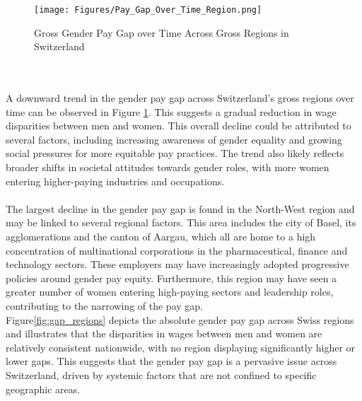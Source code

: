 \documentclass{article}
\begin{document}
\begin{figure}[t]
    \centering
    \texttt{[image: Figures/Pay\_Gap\_Over\_Time\_Region.png]}
    \caption{Gross Gender Pay Gap over Time Across Gross Regions in Switzerland}
    \label{fig:trend_regions}
\end{figure}
\\
\\
A downward trend in the gender pay gap across Switzerland's gross regions over time can be observed in Figure \ref{fig:trend_regions}. This suggests a gradual reduction in wage disparities between men and women. This overall decline could be attributed to several factors, including increasing awareness of gender equality and growing social pressures for more equitable pay practices. The trend also likely reflects broader shifts in societal attitudes towards gender roles, with more women entering higher-paying industries and occupations.\\
\\
The largest decline in the gender pay gap is found in the North-West region and may be linked to several regional factors. This area includes the city of Basel, its agglomerations and the canton of Aargau, which all are home to a high concentration of multinational corporations in the pharmaceutical, finance and technology sectors. These employers may have increasingly adopted progressive policies around gender pay equity. Furthermore, this region may have seen a greater number of women entering high-paying sectors and leadership roles, contributing to the narrowing of the pay gap.\\

Figure\ref{fig:gap_regions} depicts the absolute gender pay gap across Swiss regions and illustrates that the disparities in wages between men and women are relatively consistent nationwide, with no region displaying significantly higher or lower gaps. This suggests that the gender pay gap is a pervasive issue across Switzerland, driven by systemic factors that are not confined to specific geographic areas.\\
\end{document}

